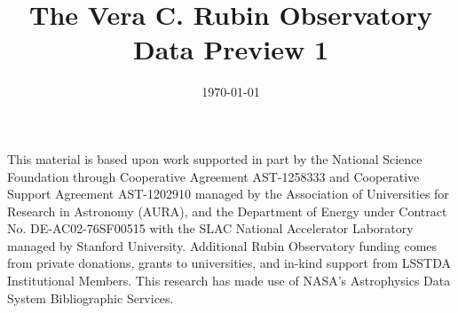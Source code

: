 \documentclass[twocolumn,twocolappendix,linenumbers,trackchanges]{aastex7}
\begin{document}
\date{\today}
\title{The Vera C. Rubin Observatory Data Preview 1}

%














\begin{acknowledgments}
This material is based upon work supported in part by the National Science Foundation through Cooperative Agreement AST-1258333 and Cooperative Support Agreement AST-1202910 managed by the Association of Universities for Research in Astronomy (AURA), and the Department of Energy under Contract No. DE-AC02-76SF00515 with the SLAC National Accelerator Laboratory managed by Stanford University.
Additional Rubin Observatory funding comes from private donations, grants to universities, and in-kind support from LSSTDA Institutional Members.
This research has made use of NASA's Astrophysics Data System Bibliographic Services.

\end{acknowledgments}
\vspace{5mm}



\appendix
\printglossaries



\end{document}
